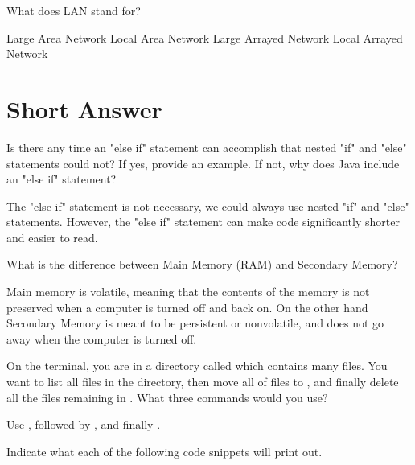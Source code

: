 \documentclass[answers,addpoints]{exam} %
\begin{document}
\begin{questions}
\question[2] What does LAN stand for? 
\begin{choices}
    \choice Large Area Network
    \CorrectChoice Local Area Network
    \choice Large Arrayed Network
    \choice Local Arrayed Network
\end{choices}

\section{Short Answer}

\question[5] Is there any time an "else if" statement can accomplish that nested "if" and "else" statements could not? If yes, provide an example. If not, why does Java include an "else if" statement? 

\begin{solution}
The "else if" statement is not necessary, we could always use nested "if" and "else" statements. However, the "else if" statement can make code significantly shorter and easier to read. 
\end{solution}

\question[5] What is the difference between Main Memory (RAM) and Secondary Memory? 

\begin{solution}
Main memory is volatile, meaning that the contents of the memory is not preserved when a computer is turned off and back on. On the other hand Secondary Memory is meant to be persistent or nonvolatile, and does not go away when the computer is turned off.
\end{solution}

\question[5] On the terminal, you are in a directory called  which contains many files. You want to list all files in the directory, then move all of  files to , and finally delete all the files remaining in . What three commands would you use?

\begin{solution}
    Use , followed by , and finally .
\end{solution}

\question Indicate what each of the following code snippets will print out.
\begin{parts}
    \part[2] \hfill\\
    

\end{parts}
\end{questions}
\end{document}
